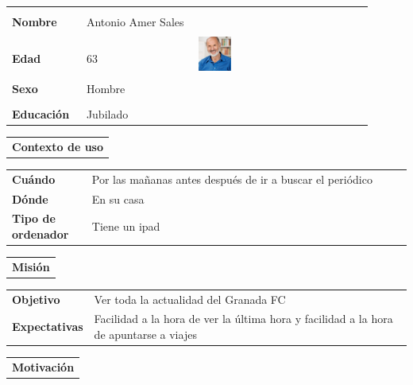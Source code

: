 \documentclass[11pt]{article}
\begin{document}
\begin{table}[H]
  \centering
	\begin{tabular}{p{0.2\linewidth}|p{0.3\linewidth}p{0.475\linewidth}}
    \toprule
    \textbf{Nombre} & Antonio Amer Sales &\multirow{4}{*}{\begin{minipage}{1.\textwidth}\includegraphics[width=0.2\textwidth, height=30mm]{Antonio}\end{minipage}}\\\\
    \textbf{Edad} & 63 & \\
    \textbf{Sexo} & Hombre & \\
    \textbf{Educación} & Jubilado & \\
    \bottomrule
  \end{tabular}

  \begin{tabular}{l}
    \textbf{Contexto de uso} 
  \end{tabular}
  
  \begin{tabular}{p{0.2\linewidth}|p{0.8\linewidth}}
    \toprule
    \textbf{Cuándo} & Por las mañanas antes después de ir a buscar el periódico\\
    \textbf{Dónde}  & En su casa\\
    \textbf{Tipo de ordenador} & Tiene un ipad\\
    \bottomrule
  \end{tabular}

  \begin{tabular}{l}
    \textbf{Misión} 
  \end{tabular}
  
  \begin{tabular}{p{0.2\linewidth}|p{0.8\linewidth}}
    \toprule
    \textbf{Objetivo} & Ver toda la actualidad del Granada FC \\
    \textbf{Expectativas}  & Facilidad a la hora de ver la última hora y facilidad a la hora de apuntarse a viajes\\
    \bottomrule
  \end{tabular}

  \begin{tabular}{l}
    \textbf{Motivación} 
  \end{tabular}


\end{table}
\end{document}
